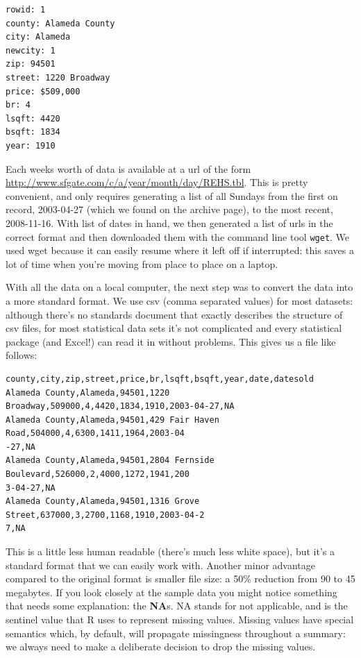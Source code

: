 \documentclass[oneside]{article}
\begin{document}
\begin{verbatim}
rowid: 1
county: Alameda County
city: Alameda
newcity: 1
zip: 94501
street: 1220 Broadway
price: $509,000
br: 4
lsqft: 4420
bsqft: 1834
year: 1910
\end{verbatim}

Each weeks worth of data is available at a url of the form \url{http://www.sfgate.com/c/a/year/month/day/REHS.tbl}.  This is pretty convenient, and only requires generating a list of all Sundays from the first on record, 2003-04-27 (which we found on the archive page), to the most recent, 2008-11-16.  With list of dates in hand, we then generated a list of urls in the correct format and then downloaded them with the command line tool {\tt wget}. We used wget because it can easily resume where it left off if interrupted: this saves a lot of time when you're moving from place to place on a laptop.

With all the data on a local computer, the next step was to convert the data into a more standard format.  We use csv (comma separated values) for most datasets: although there's no standards document that exactly describes the structure of csv files, for most statistical data sets it's not complicated and every statistical package (and Excel!) can read it in without problems.   This gives us a file like follows:

\begin{verbatim}
county,city,zip,street,price,br,lsqft,bsqft,year,date,datesold
Alameda County,Alameda,94501,1220 Broadway,509000,4,4420,1834,1910,2003-04-27,NA
Alameda County,Alameda,94501,429 Fair Haven Road,504000,4,6300,1411,1964,2003-04
-27,NA
Alameda County,Alameda,94501,2804 Fernside Boulevard,526000,2,4000,1272,1941,200
3-04-27,NA
Alameda County,Alameda,94501,1316 Grove Street,637000,3,2700,1168,1910,2003-04-2
7,NA
\end{verbatim}

This is a little less human readable (there's much less white space), but it's a standard format that we can easily work with.  Another minor advantage compared to the original format is smaller file size: a 50\% reduction from 90 to 45 megabytes.  If you look closely at the sample data you might notice something that needs some explanation: the {\bf NA}s.  NA stands for not applicable, and is the sentinel value that R uses to represent missing values.  Missing values have special semantics which, by default, will propagate missingness throughout a summary: we always need to make a deliberate decision to drop the missing values.
\end{document}
